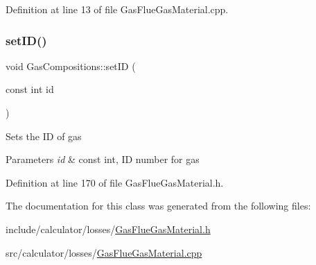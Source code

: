 Definition at line 13 of file Gas\+Flue\+Gas\+Material.\+cpp.

\mbox{\label{class_gas_compositions_a9fc3ebfcbda7134b67ed76a39b4c94cc}} 
\subsubsection{\texorpdfstring{set\+I\+D()}{setID()}}
{\footnotesize\ttfamily void Gas\+Compositions\+::set\+ID (\begin{DoxyParamCaption}\item[{const int}]{id }\end{DoxyParamCaption})\hspace{0.3cm}{\ttfamily [inline]}}

Sets the ID of gas 
\begin{DoxyParams}{Parameters}
{\em id} & const int, ID number for gas \\
\hline
\end{DoxyParams}


Definition at line 170 of file Gas\+Flue\+Gas\+Material.\+h.



The documentation for this class was generated from the following files\+:\begin{DoxyCompactItemize}
\item 
include/calculator/losses/\hyperlink{_gas_flue_gas_material_8h}{Gas\+Flue\+Gas\+Material.\+h}\item 
src/calculator/losses/\hyperlink{_gas_flue_gas_material_8cpp}{Gas\+Flue\+Gas\+Material.\+cpp}\end{DoxyCompactItemize}
